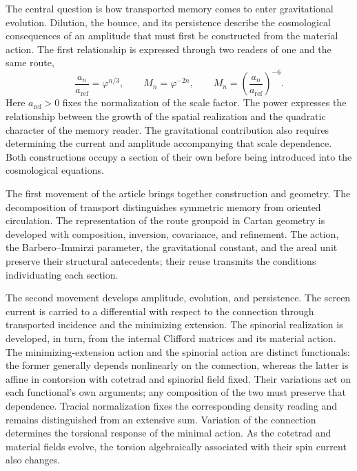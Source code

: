 The central question is how transported memory comes to enter
gravitational evolution. Dilution, the bounce, and its persistence
describe the cosmological consequences of an amplitude that must first
be constructed from the material action. The first relationship is expressed
through two readers of one and the same route,
\begin{equation}
 \frac{a_n}{a_{\mathrm{ref}}}=\varphi^{n/3},
 \qquad M_n=\varphi^{-2n},
 \qquad
 M_n=\left(\frac{a_n}{a_{\mathrm{ref}}}\right)^{-6}.
 \label{vii:eq:programa-dilucion}
\end{equation}
Here \(a_{\mathrm{ref}}>0\) fixes the normalization of the scale factor.
The power expresses the relationship between the growth of the spatial
realization and the quadratic character of the memory reader. The gravitational
contribution also requires determining the current and amplitude accompanying
that scale dependence. Both constructions occupy a section of their own
before being introduced into the cosmological equations.

The first movement of the article brings together construction and geometry.
The decomposition of transport distinguishes symmetric memory from oriented
circulation. The representation of the route groupoid in Cartan geometry
is developed with composition, inversion, covariance, and refinement.
The action, the Barbero--Immirzi parameter, the gravitational constant, and the
areal unit preserve their structural antecedents; their reuse
transmits the conditions individuating each section.

The second movement develops amplitude, evolution, and persistence.
The screen current is carried to a differential with respect to the
connection through transported incidence and the minimizing extension.
The spinorial realization is developed, in turn, from the internal
Clifford matrices and its material action. The minimizing-extension
action and the spinorial action are distinct functionals: the former
generally depends nonlinearly on the connection, whereas the latter is
affine in contorsion with cotetrad and spinorial field fixed. Their
variations act on each functional's own arguments; any composition of
the two must preserve that dependence.
Tracial normalization
fixes the corresponding density reading and remains distinguished from
an extensive sum. Variation of the connection determines the torsional
response of the minimal action. As the cotetrad and material fields evolve,
the torsion algebraically associated with their spin current also changes.

